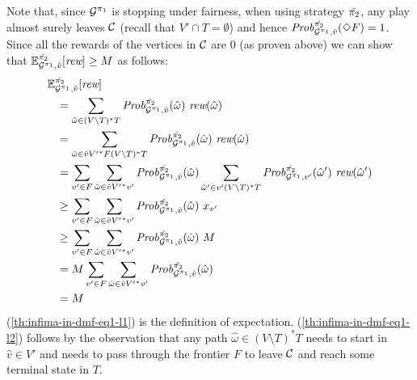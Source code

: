 \begin{myproof}
\begin{proofofclaim}
    Note that, since $\mathcal{G}^{\pi_{1}}$ is stopping under fairness,
    when using strategy $\hat{\pi_{2}}$, any play almost surely
    leaves $\mathcal{C}$ (recall that $V' \cap T = \emptyset$) and hence
    $\mathit{Prob}^{\hat{\pi_{2}}}_{\mathcal{G}^{\pi_{1}},\hat{v}} (\Diamond F) = 1$.
    Since all the rewards of the vertices in $\mathcal{C}$ are $0$ (as
    proven above) we can show that
    $\mathbb{E}^{\hat{\pi_{2}}}_{\mathcal{G}^{\pi_{1}},\hat{v}}[\textit{rew}]
    \geq M$ as follows:
    \begin{align}	
      \ExpectMDP{\hat{\strat{2}}}_{\StochG^{\strat{1}},\hat{v}}[\Rewards] \hspace{-4em} & \notag\\
      \label{th:infima-in-dmf-eq1-l1}
      &= \sum_{\hat{\omega} \in (V \setminus T)^*T} \MDPProb{\hat{\strat{2}}}_{\StochG^{\strat{1}},\hat{v}}(\hat{\omega})\ \Rewards(\hat{\omega}) \\
      \label{th:infima-in-dmf-eq1-l2}
      &=\sum_{\hat{\omega} \in \hat{v}{V'}^*F(V \setminus T)^*T} \MDPProb{\hat{\strat{2}}}_{\StochG^{\strat{1}},\hat{v}}(\hat{\omega})\ \Rewards(\hat{\omega}) \\
      \label{th:infima-in-dmf-l3}
      &= \sum_{v' \in F} \sum_{\hat{\omega} \in \hat{v}{V'}^*v'} \MDPProb{\hat{\strat{2}}}_{\StochG^{\strat{1}},\hat{v}}(\hat{\omega}) \sum_{\hat{\omega}' \in v' (V \setminus T)^*T}  \MDPProb{\hat{\strat{2}}}_{\StochG^{\strat{1}},v'}(\hat{\omega}')\ \Rewards(\hat{\omega}')\\
      \label{th:infima-in-dmf-l4}
      &\geq \sum_{v' \in F} \sum_{\hat{\omega} \in \hat{v}{V'}^*v'} \MDPProb{\hat{\strat{2}}}_{\StochG^{\strat{1}},\hat{v}}(\hat{\omega})\ x_{v'} \\
      \label{th:infima-in-dmf-l5}
      &\geq \sum_{v' \in F} \sum_{\hat{\omega} \in \hat{v}{V'}^*v'} \MDPProb{\hat{\strat{2}}}_{\StochG^{\strat{1}},\hat{v}}(\hat{\omega})\ M \\
      \label{th:infima-in-dmf-l6}
      &= M  \sum_{v' \in F} \sum_{\hat{\omega} \in \hat{v}{V'}^*v'} \MDPProb{\hat{\strat{2}}}_{\StochG^{\strat{1}},\hat{v}}(\hat{\omega}) \\
      \label{th:infima-in-dmf-l7}
      &= M
    \end{align}
    (\ref{th:infima-in-dmf-eq1-l1}) is the definition of expectation.
    (\ref{th:infima-in-dmf-eq1-l2}) follows by the observation that
    any path $\hat{\omega} \in (V \setminus T)^*T$ needs to start in
    $\hat{v}\in V'$ and needs to pass through the frontier $F$ to
    leave $\mathcal{C}$ and reach some terminal state in $T$.

\end{proofofclaim}
\end{myproof}
